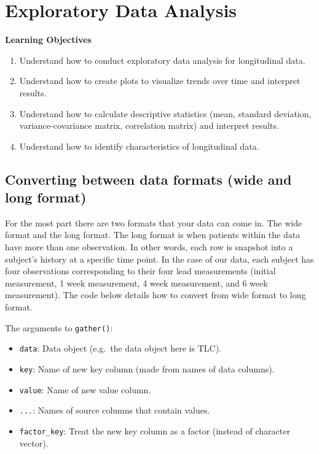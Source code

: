 \documentclass[
  letterpaper,
  DIV=11,
  numbers=noendperiod]{scrreprt}
\providecommand{\tightlist}{%
  \setlength{\itemsep}{0pt}\setlength{\parskip}{0pt}}\usepackage{longtable,booktabs,array}
\begin{document}
\hypertarget{sec-longi-EDA}{%
\chapter{Exploratory Data Analysis}\label{sec-longi-EDA}}

\textbf{Learning Objectives}

\begin{enumerate}
\def\labelenumi{\arabic{enumi}.}
\item
  Understand how to conduct exploratory data analysis for longitudinal
  data.
\item
  Understand how to create plots to visualize trends over time and
  interpret results.
\item
  Understand how to calculate descriptive statistics (mean, standard
  deviation, variance-covariance matrix, correlation matrix) and
  interpret results.
\item
  Understand how to identify characteristics of longitudinal data.
\end{enumerate}

\hypertarget{converting-between-data-formats-wide-and-long-format}{%
\section{Converting between data formats (wide and long
format)}\label{converting-between-data-formats-wide-and-long-format}}

For the most part there are two formats that your data can come in. The
wide format and the long format. The long format is when patients within
the data have more than one observation. In other words, each row is
snapshot into a subject's history at a specific time point. In the case
of our data, each subject has four observations corresponding to their
four lead measurements (initial measurement, 1 week measurement, 4 week
measurement, and 6 week measurement). The code below details how to
convert from wide format to long format.

The arguments to \texttt{gather()}:

\begin{itemize}
\tightlist
\item
  \texttt{data}: Data object (e.g.~the data object here is TLC).
\item
  \texttt{key}: Name of new key column (made from names of data
  columns).
\item
  \texttt{value}: Name of new value column.
\item
  \texttt{...}: Names of source columns that contain values.
\item
  \texttt{factor\_key}: Treat the new key column as a factor (instead of
  character vector).
\end{itemize}
\end{document}
